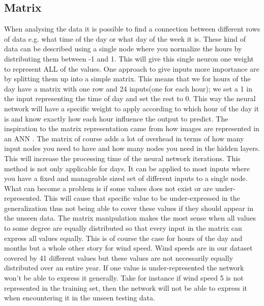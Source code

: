 \subsection{Matrix}
\label{sec:Matrix}
When analysing the data it is possible to find a connection between different rows of data e.g. what time of the day or what day of the week it is. These kind of data can be described using a single node where you normalize the hours by distributing them between -1 and 1. This will give this single neuron one weight to represent ALL of the values. One approach to give inputs more importance are by splitting them up into a simple matrix. This means that we for hours of the day have a matrix with one row and 24 inputs(one for each hour); we set a 1 in the input representing the time of day and set the rest to 0. This way the neural network will have a specific weight to apply according to which hour of the day it is and know exactly how each hour influence the output to predict. The inspiration to the matrix representation came from how images are represented in an ANN \cite{knerr1992handwritten}. The matrix of course adds a lot of overhead in terms of how many input nodes you need to have and how many nodes you need in the hidden layers. This will increase the processing time of the neural network iterations. This method is not only applicable for days. It can be applied to most inputs where you have a fixed and manageable sized set of different inputs to a single node. What can become a problem is if some values does not exist or are under-represented. This will cause that specific value to be under-expressed in the generalization thus not being able to cover these values if they should appear in the unseen data. The matrix manipulation makes the most sense when all values to some degree are equally distributed so that every input in the matrix can express all values equally. This is of course the case for hours of the day and months but a whole other story for wind speed. Wind speeds are in our dataset covered by 41 different values but these values are not necessarily equally distributed over an entire year. If one value is under-represented the network won't be able to express it generally. Take for instance if wind speed 5 is not represented in the training set, then the network will not be able to express it when encountering it in the unseen testing data.

